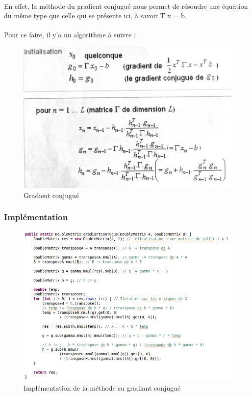 \documentclass[a4paper,11pt]{article}
\begin{document}
			\paragraph{}
			En effet, la méthode du gradient conjugué nous permet de résoudre une équation du même type que celle qui se présente ici, à savoir T \time x = b.


			\paragraph{}
			Pour ce faire, il y'a un algorithme à suivre :

			\begin{figure}[h]
				\centerline{\includegraphics[scale=0.50]{img/gradient_conjugue.png}}
				\caption{Gradient conjugué }
				\label{diagramme-composants}
			\end{figure}

			\subsubsection{Implémentation}

			\begin{figure}[h]
				\centerline{\includegraphics[scale=0.50]{img/gradiantConjugue.png}}
				\caption{Implémentation de la méthode su gradiant conjugué}
				\label{diagramme-composants}
			\end{figure}
\end{document}
